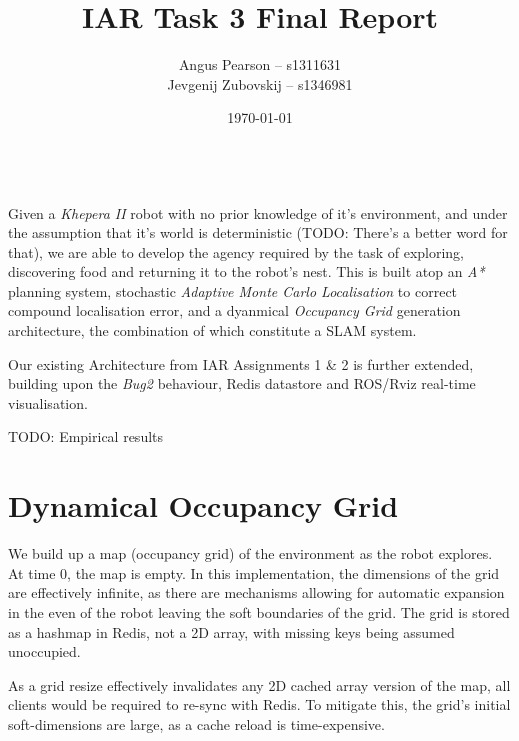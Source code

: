 \documentclass[11pt, a4paper]{article}
\renewenvironment{abstract}{%
{\mdseries\scshape\Large\abstractname}
\vspace{1em}\\
}{\par\noindent}
\begin{document}
\title{IAR Task 3 Final Report}
\author{Angus Pearson -- s1311631\\ Jevgenij Zubovskij -- s1346981}
\date{\today}
\maketitle



\begin{abstract}
Given a \textit{Khepera II} robot with no prior knowledge of it's environment, and under the 
assumption that it's world is deterministic (TODO: There's a better word for that), we are able 
to develop the agency required by the task of exploring, discovering food and returning it to the 
robot's nest. This is built atop an \textit{A*} planning system, stochastic \textit{Adaptive Monte Carlo 
Localisation}\cite{principlesrobot} to correct compound localisation error, and a dyanmical 
\textit{Occupancy Grid} generation architecture, the combination of which constitute a SLAM system.

Our existing Architecture from IAR Assignments 1\cite{task1_report} \& 2\cite{task2_report} is further
extended, building upon the \textit{Bug2} behaviour, Redis datastore and ROS/Rviz real-time 
visualisation.

TODO: Empirical results
\end{abstract}




\section{Dynamical Occupancy Grid}

We build up a map (occupancy grid) of the environment as the robot explores. At time 0, the map
is empty. In this implementation, the dimensions of the grid are effectively infinite, as there are
mechanisms allowing for automatic expansion in the even of the robot leaving the soft boundaries of
the grid. The grid is stored as a hashmap in Redis, not a 2D array, with missing keys being assumed 
unoccupied.

As a grid resize effectively invalidates any 2D cached array version of the map, all clients 
would be required to re-sync with Redis. To mitigate this, the grid's initial soft-dimensions
are large, as a cache reload is time-expensive.
\end{document}
